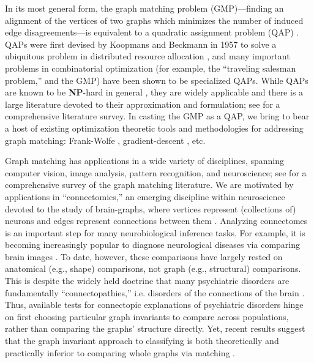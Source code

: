 \documentclass[10pt]{article}
\begin{document}
In its most general form, the graph matching problem (GMP)---finding an alignment of the vertices of two graphs which minimizes the number of induced edge disagreements---is equivalent to a quadratic assignment problem (QAP) \cite{Umeyama1988}.
QAPs were first devised by Koopmans and Beckmann in 1957 to solve a ubiquitous problem in distributed resource allocation \cite{Koopmans1957}, and many important problems in combinatorial optimization (for example, the ``traveling salesman problem,'' and the GMP) have been shown to be specialized QAPs.  
While QAPs are known to be {\bf NP}-hard in general \cite{Papadimitriou1998},
they are widely applicable and there is a large literature devoted to their approximation and formulation; see \cite{burkard} for a comprehensive literature survey.
In casting the GMP as a QAP, we bring to bear a host of existing optimization theoretic tools and methodologies for addressing graph matching: Frank-Wolfe \cite{Frank1956}, gradient-descent \cite{bazaraa2013nonlinear}, etc.

Graph matching has applications in a wide variety of disciplines, spanning computer vision, image analysis, pattern recognition, and neuroscience; see \cite{Conte2004} for a comprehensive survey of the graph matching literature.  
We are motivated by applications in ``connectomics,''  an emerging discipline within neuroscience devoted to the study of brain-graphs, where vertices represent (collections of) neurons and edges represent connections between them \cite{Sporns05a, Hagmann05a}.  Analyzing connectomes is an important step for many neurobiological inference tasks.  For example, it is becoming increasingly popular to diagnose neurological diseases via comparing brain images \cite{Csernansky2004}.  To date, however, these comparisons have largely rested on anatomical (e.g., shape) comparisons, not graph (e.g., structural) comparisons.  This is despite the widely held doctrine that many
psychiatric disorders are fundamentally ``connectopathies,'' i.e. disorders of the connections of the brain \cite{Kubicki2007,Calhoun2011,Fornito2012,Fornito2012a}.   
Thus, available tests for connectopic explanations of psychiatric disorders hinge on first choosing particular graph invariants to compare across populations, rather than comparing the graphs' structure directly. Yet, recent results suggest that the graph invariant approach to classifying is both theoretically and practically inferior to comparing whole graphs via matching \cite{VP11_unlabeled}. 
\end{document}
